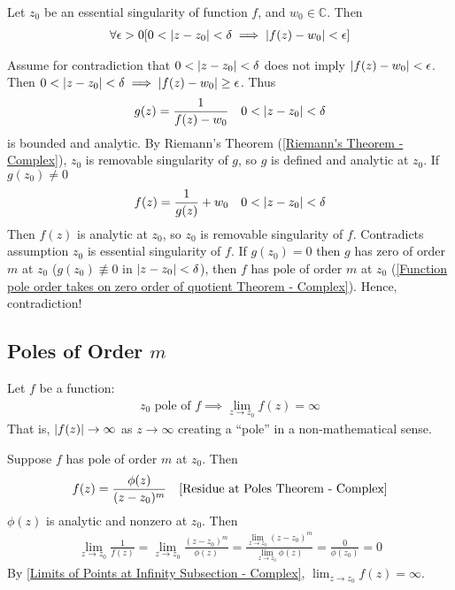 \documentclass[12pt, english]{book}
\makeatletter
\renewenvironment{proof}[1][\proofname]{\par
	\pushQED{\qed}%
	\normalfont \topsep6\p@\@plus6\p@\relax
	\list{}{%
		\settowidth{\leftmargin}{\itshape\proofname:\hskip\labelsep}%
		\setlength{\labelwidth}{0pt}%
		\setlength{\itemindent}{-\leftmargin}%
	}%
	\item[\hskip\labelsep\itshape#1\@addpunct{:}]\ignorespaces
}{%
	\popQED\endlist\@endpefalse
}
\makeatother
\begin{document}
	\begin{theorem}
		\label{Casorati-Weierstrass Theorem - Complex}
		Let \(z_0\) be an essential singularity of function \(f\), and \(w_0 \in \mathbb{C}\). Then 
		\begin{align*}
			\forall \epsilon > 0 [0<\abs{z-z_0}<\delta \implies \abs{f(z) - w_0}< \epsilon]
		\end{align*}
	\end{theorem}
	\begin{proof}
		Assume for contradiction that \(0<\abs{z-z_0}<\delta \) does not imply \(\abs{f(z) - w_0}< \epsilon\). Then \(0<\abs{z-z_0}<\delta \implies \abs{f(z) - w_0} \geq \epsilon\). Thus
		\begin{align*}
			g(z) &= \frac{1}{f(z) - w_0} & 0<\abs{z-z_0} < \delta
		\end{align*}
		is bounded and analytic. By Riemann's Theorem (\cref{Riemann's Theorem - Complex}), \(z_0\) is removable singularity of \(g\), so \(g\) is defined and analytic at \(z_0\). If \(g(z_0) \neq 0\)
		\begin{align*}
			f(z) &= \frac{1}{g(z)} + w_0 & 0 < \abs{z - z_0} < \delta
		\end{align*} 
		Then \(f(z)\) is analytic at \(z_0\), so \(z_0\) is removable singularity of \(f\). Contradicts assumption \(z_0\) is essential singularity of \(f\).
	\end{proof}
	If \(g(z_0) = 0\) then \(g\) has zero of order \(m\) at \(z_0\) (\(g(z_0) \nequiv 0 \) in \( \abs{z-z_0} < \delta\)), then \(f\) has pole of order \(m\) at \(z_0\) (\cref{Function pole order takes on zero order of quotient Theorem - Complex}). Hence, contradiction!
	
	\subsection{Poles of Order \(m\)}
	
	\begin{theorem}
		Let \(f\) be a function:
		\begin{align*}
			z_0 \text{ pole of } f \implies \lim_{z\rightarrow z_0} f(z) = \infty
		\end{align*}
		That is, \(\abs{f(z)} \rightarrow \infty\) as \(z \rightarrow \infty\) creating a ``pole'' in a non-mathematical sense. 
	\end{theorem}
	\begin{proof}
		Suppose \(f\) has pole of order \(m\) at \(z_0\). Then 
		\begin{align*}
			f(z) &= \frac{\phi(z)}{(z-z_0)^m}	&	\text{\Cref{Residue at Poles Theorem - Complex}}
		\end{align*}
		\(\phi(z)\) is analytic and nonzero at \(z_0\). Then
		\begin{align*}
			\lim_{z\rightarrow z_0} \frac{1}{f(z)} 
			= \lim_{z\rightarrow z_0} \frac{(z-z_0)^m}{\phi(z)}
			= \frac{\lim_{z\rightarrow z_0} (z-z_0)^m}{\lim_{z\rightarrow z_0} \phi(z)}
			= \frac{0}{\phi(z_0)} = 0
		\end{align*}
		By \cref{Limits of Points at Infinity Subsection - Complex}, \(\lim_{z\rightarrow z_0} f(z) = \infty\).
	\end{proof}
\end{document}

